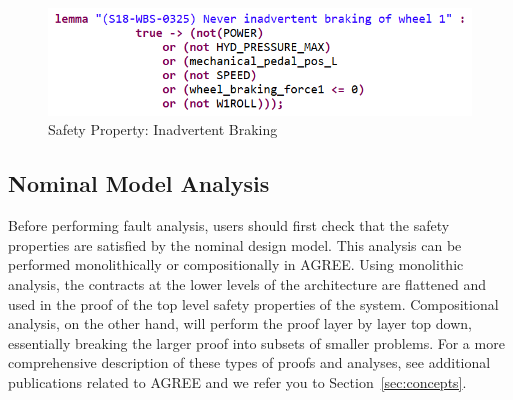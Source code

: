 \begin{figure}[htbp]
	\begin{center}
		\includegraphics[width=.7\textwidth]{images/inadvertent_braking.png}
	\end{center}
	\vspace{-0.3in}
	\caption{Safety Property: Inadvertent Braking}
	\label{fig:inadvertent_braking}
\end{figure}

\subsection{Nominal Model Analysis}
Before performing fault analysis, users should first check that the safety properties are satisfied by the nominal design model. This analysis can be performed monolithically or compositionally in AGREE. Using monolithic analysis, the contracts at the lower levels of the architecture are flattened and used in the proof of the top level safety properties of the system. Compositional analysis, on the other hand, will perform the proof layer by layer top down, essentially breaking the larger proof into subsets of smaller problems. For a more comprehensive description of these types of proofs and analyses, see additional publications related to AGREE \cite{cofer2012compositional,QFCS15:backes} and we refer you to Section~\ref{sec:concepts}.

